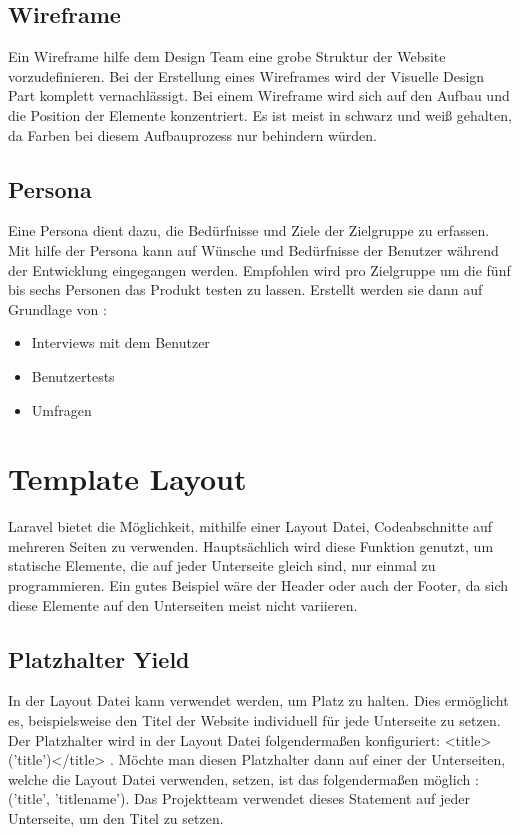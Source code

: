 \subsection{Wireframe}
Ein Wireframe hilfe dem Design Team eine grobe Struktur der Website vorzudefinieren. Bei der Erstellung eines Wireframes wird der Visuelle Design Part komplett vernachlässigt. Bei einem Wireframe wird sich auf den Aufbau und die Position der Elemente konzentriert. Es ist meist in schwarz und weiß gehalten, da Farben bei diesem Aufbauprozess nur behindern würden. 
\subsection{Persona}
Eine Persona dient dazu, die Bedürfnisse und Ziele der Zielgruppe zu erfassen. Mit hilfe der Persona kann auf Wünsche und Bedürfnisse der Benutzer während der Entwicklung eingegangen werden. Empfohlen wird pro Zielgruppe um die fünf bis sechs Personen das Produkt testen zu lassen. Erstellt werden sie dann auf Grundlage von :
\begin{itemize}
	\item Interviews mit dem Benutzer
	\item Benutzertests
	\item Umfragen
\end{itemize}

\section{Template Layout}
Laravel bietet die Möglichkeit, mithilfe einer Layout Datei, Codeabschnitte auf mehreren Seiten zu verwenden. Hauptsächlich wird diese Funktion genutzt, um statische Elemente, die auf jeder Unterseite gleich sind, nur einmal zu programmieren. Ein gutes Beispiel wäre der Header oder auch der Footer, da sich diese Elemente auf den Unterseiten meist nicht variieren. 

\subsection{Platzhalter Yield}
In der Layout Datei kann \@yield verwendet werden, um Platz zu halten. Dies ermöglicht es, beispielsweise den Titel der Website individuell für jede Unterseite zu setzen. Der Platzhalter wird in der Layout Datei folgendermaßen konfiguriert:  <title>\@yield('title')</title> .  Möchte man diesen Platzhalter dann auf einer der Unterseiten, welche die Layout Datei verwenden, setzen, ist das folgendermaßen möglich : \@section('title', 'titlename'). Das Projektteam verwendet dieses Statement auf jeder Unterseite, um den Titel zu setzen.


